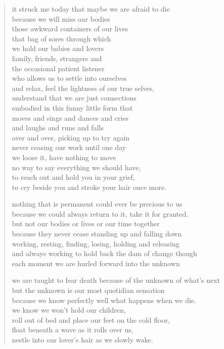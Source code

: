 
\begin{verse}
it struck me today that maybe we are afraid to die \\
because we will miss our bodies \\
those awkward containers of our lives \\
that bag of sores through which \\
we hold our babies and lovers \\
family, friends, strangers and \\
the occasional patient listener \\
who allows us to settle into ourselves \\
and relax, feel the lightness of our true selves, \\
understand that we are just connections \\
embodied in this funny little form that \\
moves and sings and dances and cries \\
and laughs and runs and falls \\
over and over, picking up to try again \\
never ceasing our work until one day \\
we loose it, have nothing to move \\
no way to say everything we should have, \\
to reach out and hold you in your grief, \\
to cry beside you and stroke your hair once more.

nothing that is permanent could ever be precious to us \\
because we could always return to it, take it for granted. \\
but not our bodies or lives or our time together \\
because they never cease standing up and falling down \\
working, resting, finding, losing, holding and releasing \\
and always working to hold back the dam of change though \\
each moment we are hurled forward into the unknown

we are taught to fear death because of the unknown of what's next\\
but the unknown is our most quotidian sensation\\
because we know perfectly well what happens when we die.\\
we know we won't hold our children,\\
roll out of bed and place our feet on the cold floor,\\
float beneath a wave as it rolls over us,\\
nestle into our lover's hair as we slowly wake.


\end{verse}
